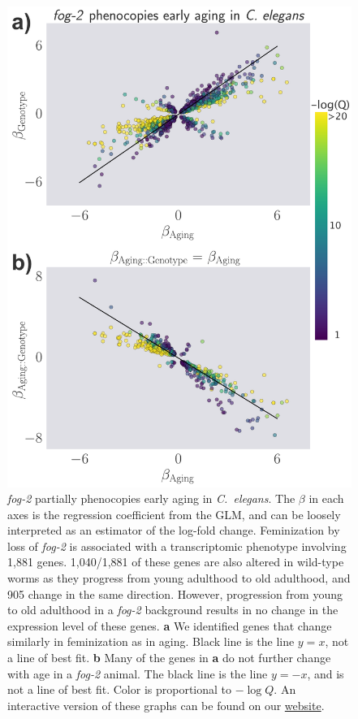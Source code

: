 \documentclass[10pt,letterpaper,twocolumn]{article}
\newcommand{\cel}{\emph{C.~elegans}}
\newcommand{\fog}{\emph{fog-2}}
\newcommand{\fogn}{1,881}
\newcommand{\coexpressed}{905}
\newcommand{\intersectn}{1,040}
\newcommand{\webref}{
\href{https://wormlabcaltech.github.io/Angeles_Leighton_2016/}{website}}
\begin{document}
\begin{figure}
\renewcommand{\familydefault}{\sfdefault}\normalfont{}
\centering
\includegraphics[width=\linewidth]{../output/figs/final_figs/aberrant_aging.pdf}
\caption{ \fog{} partially phenocopies early aging in \cel{}. The $\beta$ in each axes is the regression coefficient from the GLM, and can be loosely interpreted as an estimator of the log-fold change.
Feminization by loss of \fog{} is associated with a transcriptomic phenotype involving \fogn{} genes. \intersectn{}/\fogn{} of these genes are also altered in wild-type worms as they progress from young adulthood to old adulthood, and \coexpressed{} change in the same direction. However, progression from young to old adulthood in a \fog{} background results in no change in the expression level of these genes. \textbf{a} We identified genes that change similarly in feminization as in aging. Black line is the line $y=x$, not a line of best fit. \textbf{b} Many of the genes in \textbf{a} do not further change with age in a \fog{} animal.
The black line is the line $y=-x$, and is not a line of best fit. Color is proportional to $-\log{Q}$.
An interactive version of these graphs can be found on our \webref{}.
}%
\label{fig:aberrant_aging}
\end{figure}
\end{document}
